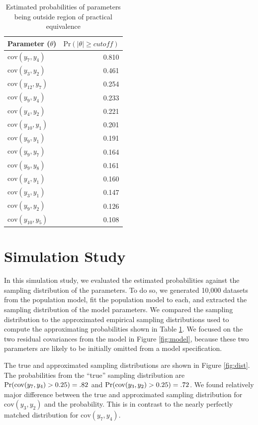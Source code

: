\documentclass[man, noextraspace, floatsintext, 12pt]{apa7}
\begin{document}
\begin{table}[ht]
\centering
\caption{Estimated probabilities of parameters being outside region of practical equivalence}
\label{tb:prob}
\begin{tabular}{lr}
  \toprule
Parameter ($\theta$) & $\mathrm{Pr}( \mid \theta \mid \geq cutoff)$\\ 
  \midrule
  $\mathrm{cov}(y_7, y_4)$ & 0.810 \\ 
  $\mathrm{cov}(y_3, y_2)$ & 0.461  \\ 
  $\mathrm{cov}(y_{12}, y_7)$ & 0.254 \\ 
  $\mathrm{cov}(y_9, y_4)$ & 0.233 \\ 
  $\mathrm{cov}(y_4, y_2)$ & 0.221 \\ 
  $\mathrm{cov}(y_{10}, y_1)$ & 0.201  \\ 
  $\mathrm{cov}(y_9, y_1)$ & 0.191  \\ 
  $\mathrm{cov}(y_9, y_7)$ & 0.164  \\ 
  $\mathrm{cov}(y_9, y_8)$ & 0.161  \\ 
  $\mathrm{cov}(y_4, y_1)$ & 0.160  \\ 
  $\mathrm{cov}(y_3, y_1)$ & 0.147  \\ 
  $\mathrm{cov}(y_9, y_2)$ & 0.126  \\ 
  $\mathrm{cov}(y_{10}, y_5)$ & 0.108  \\
   \bottomrule
\end{tabular}
\end{table}


\section{Simulation Study}

In this simulation study, we evaluated the estimated probabilities against the sampling distribution of the parameters.
To do so, we generated 10,000 datasets from the population model, fit the population model to each, and extracted the sampling distribution of the model parameters.
We compared the sampling distribution to the approximated empirical sampling distributions used to compute the approximating probabilities shown in Table \ref{tb:prob}.
We focused on the two residual covariances from the model in Figure \ref{fig:model}, because these two parameters are likely to be initially omitted from a model specification.

The true and approximated sampling distributions are shown in Figure \ref{fig:dist}.
The probabilities from the ``true'' sampling distribution are ${\rm Pr}(\mathrm{cov}(y_7, y_4) > 0.25) = .82$ and ${\rm Pr}(\mathrm{cov}(y_3, y_2) > 0.25) = .72$.
We found relatively major difference between the true and approximated sampling distribution for $\mathrm{cov}(y_3, y_2)$ and the probability.
This is in contrast to the nearly perfectly matched distribution for $\mathrm{cov}(y_7, y_4)$.
\end{document}
